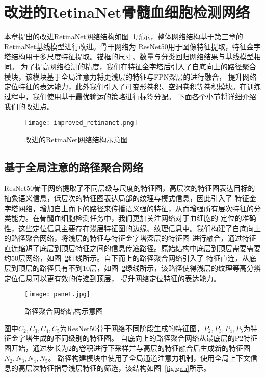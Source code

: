 \section{改进的RetinaNet骨髓血细胞检测网络}
本章提出的改进RetinaNet网络结构如图~\ref{fig:improved_retinanet}所示，整体网络结构基于第三章的RetinaNet基线模型进行改进。骨干网络为
ResNet50用于图像特征提取，特征金字塔结构用于多尺度特征提取。锚框的尺寸、数量与分类回归网络结果与基线模型相同。
为了提高网络检测的精度，我们在特征金字塔后引入了自底向上的路径聚合模块，该模块基于全局注意力将更浅层的特征与FPN深层的进行融合，
提升网络定位特征的表达能力，此外我们引入了可变形卷积、空洞卷积等卷积模块。在训练过程中，我们使用基于最优输运的策略进行标签分配。
下面各个小节将详细介绍我们的改进点。
\begin{figure}[htbp]                     
  \centering                      
  \texttt{[image: improved\_retinanet.png]}                      
  \caption{改进的RetinaNet网络结构示意图}                      
  \label{fig:improved_retinanet}       
\end{figure}  

\subsection{基于全局注意的路径聚合网络}
ResNet50骨干网络提取了不同层级与尺度的特征图，高层次的特征图表达目标的抽象语义信息，低层次的特征图表达局部的纹理与模式信息，因此引入了
特征金字塔网络，增加自上而下的路径来传播语义强的特征，从而增强所有层次特征的分类能力。在骨髓血细胞检测任务中，我们更加关注网络对于血细胞的
定位的准确性，这些定位信息主要存在浅层特征图的边缘、纹理信息中。我们构建了自底向上的路径聚合网络，将浅层的特征与特征金字塔深层的特征图
进行融合，通过特征直连缩短了底层到顶层特征之间的信息传递路径。原始结构中底层到顶层需要需要约50层网络，如图~\ref{fig:panet}红线所示。自下而上的路径聚合网络引入了
特征直连，从底层到顶层的路径只有不到10层，如图~\ref{fig:panet}绿线所示，该路径使得浅层的纹理等高分辨定位信息可以更有效的传递到顶层，
提升网络定位特征的表达能力。
\begin{figure}[htbp]                     
  \centering                      
  \texttt{[image: panet.jpg]}                      
  \caption{路径聚合网络结构示意图}                      
  \label{fig:panet}       
\end{figure}  

图中${C_2, C_3, C_4, C_5}$为ResNet50骨干网络不同阶段生成的特征图，${P_2, P_3, P_4, P_5}$为特征金字塔生成的不同级别的特征图。
自底向上的路径聚合网络从最底层的P2特征图开始，通过步长为2的卷积进行下采样并与高层的特征融合后生成新的特征图${N_2, N_3, N_4, N_5}$。
路径构建模块中使用了全局通道注意力机制，使用全局上下文信息的高层次特征指导浅层特征的筛选，该结构如图~\ref{fig:gau}所示。

